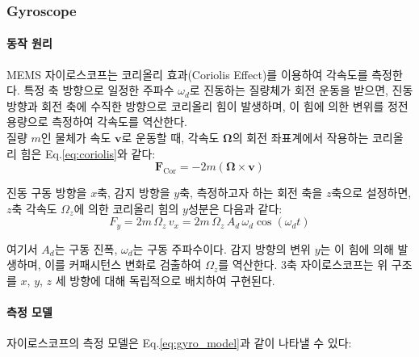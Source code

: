         \subsubsection{Gyroscope}
            \paragraph{동작 원리}
                MEMS 자이로스코프는 코리올리 효과(Coriolis Effect)를 이용하여 각속도를 측정한다. 특정 축 방향으로 일정한 주파수 $\omega_d$로 진동하는 질량체가 회전 운동을 받으면, 진동 방향과 회전 축에 수직한 방향으로 코리올리 힘이 발생하며, 이 힘에 의한 변위를 정전 용량으로 측정하여 각속도를 역산한다.\\

                질량 $m$인 물체가 속도 $\mathbf{v}$로 운동할 때, 각속도 $\boldsymbol{\Omega}$의 회전 좌표계에서 작용하는 코리올리 힘은 Eq.\ref{eq:coriolis}와 같다:\\

                \begin{equation}
                    \mathbf{F}_{\text{Cor}} = -2m\left(\boldsymbol{\Omega} \times \mathbf{v}\right)
                    \label{eq:coriolis}
                \end{equation}

                진동 구동 방향을 $x$축, 감지 방향을 $y$축, 측정하고자 하는 회전 축을 $z$축으로 설정하면, $z$축 각속도 $\Omega_z$에 의한 코리올리 힘의 $y$성분은 다음과 같다:\\

                \begin{equation}
                    F_y = 2m\,\Omega_z\,v_x = 2m\,\Omega_z\,A_d\,\omega_d\cos(\omega_d t)
                    \label{eq:coriolis_y}
                \end{equation}

                \noindent 여기서 $A_d$는 구동 진폭, $\omega_d$는 구동 주파수이다. 감지 방향의 변위 $y$는 이 힘에 의해 발생하며, 이를 커패시턴스 변화로 검출하여 $\Omega_z$를 역산한다. 3축 자이로스코프는 위 구조를 $x$, $y$, $z$ 세 방향에 대해 독립적으로 배치하여 구현된다.\\

            \paragraph{측정 모델}
                자이로스코프의 측정 모델은 Eq.\ref{eq:gyro_model}과 같이 나타낼 수 있다:\\

